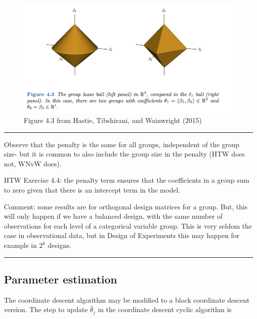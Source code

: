 \documentclass[
  letterpaper,
  DIV=11,
  numbers=noendperiod]{scrartcl}
\begin{document}
\begin{figure}

{\centering \includegraphics[width=1\textwidth,height=\textheight]{./HTWFig43.png}

}

\caption{Figure 4.3 from Hastie, Tibshirani, and Wainwright (2015)}

\end{figure}

\begin{center}\rule{0.5\linewidth}{0.5pt}\end{center}

Observe that the penalty is the same for all groups, independent of the
group size- but it is common to also include the group size in the
penalty (HTW does not, WNvW does).

HTW Exercise 4.4: the penalty term ensures that the coefficients in a
group sum to zero given that there is an intercept term in the model.

Comment: some results are for orthogonal design matrices for a group.
But, this will only happen if we have a balanced design, with the same
number of observations for each level of a categorical variable group.
This is very seldom the case in observational data, but in Design of
Experiments this may happen for example in \(2^k\) designs.

\begin{center}\rule{0.5\linewidth}{0.5pt}\end{center}

\hypertarget{parameter-estimation-1}{%
\subsection{Parameter estimation}\label{parameter-estimation-1}}

The coordinate descent algorithm may be modified to a block coordinate
descent version. The step to update \(\hat{\theta}_j\) in the coordinate
descent cyclic algorithm is
\end{document}
